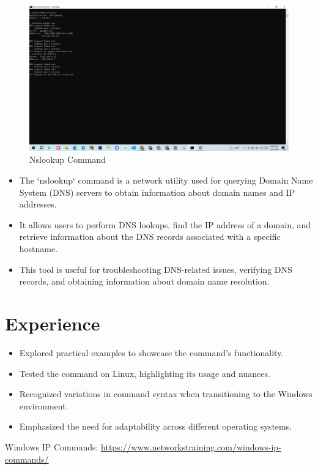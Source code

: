 \documentclass[11pt]{article}
\begin{document}
\subsection{}
\begin{figure}[!h]
\centering
\includegraphics[width=\textwidth]{Screenshot (6).png}
\caption{Nslookup Command}
\end{figure}

\begin{itemize}
  \item The `nslookup` command is a network utility used for querying Domain Name System (DNS) servers to obtain information about domain names and IP addresses.
  \item It allows users to perform DNS lookups, find the IP address of a domain, and retrieve information about the DNS records associated with a specific hostname.
  \item This tool is useful for troubleshooting DNS-related issues, verifying DNS records, and obtaining information about domain name resolution.
\end{itemize}







\newpage
\section{Experience}
\begin{itemize}
  \item Explored practical examples to showcase the command's functionality.
  \item Tested the command on Linux, highlighting its usage and nuances.
  \item Recognized variations in command syntax when transitioning to the Windows environment.
  \item Emphasized the need for adaptability across different operating systems.
\end{itemize}


\begin{thebibliography}{1}
   Windows IP Commands: \url{https://www.networkstraining.com/windows-ip-commands/}
\end{thebibliography}
\end{document}
